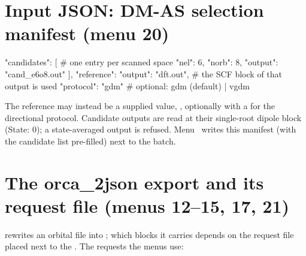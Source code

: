 \section{Input JSON: DM-AS selection manifest (menu 20)}

\begin{codeblock}
{
  "candidates": [                         # one entry per scanned space
    {"nel": 6, "norb": 8, "output": "cand_e6o8.out"}
  ],
  "reference": {"output": "dft.out"},     # the SCF block of that output is used
  "protocol": "gdm"                       # optional: gdm (default) | vgdm
}
\end{codeblock}

The reference may instead be a supplied value,
, optionally
with a  for the directional protocol.  Candidate outputs are
read at their single-root dipole block (State: 0); a state-averaged output is
refused.  Menu~ writes this manifest (with the candidate list
pre-filled) next to the batch.

\section{The orca\_2json export and its request file (menus 12--15, 17, 21)}

 rewrites an orbital file into
; which blocks it carries depends on the request file
 placed next to the .  The requests the
menus use:

